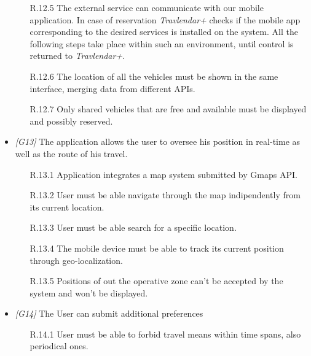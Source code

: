 \begin{itemize}
\begin{itemize}
			\item [R.12.5] The external service can communicate with our mobile application. In case of reservation \textit{Travlendar+} checks if the mobile app corresponding to the desired services is installed on the system. All the following steps take place within such an environment, until control is returned to \textit{Travlendar+}.

			\item [R.12.6] The location of all the vehicles must be shown in the same interface, merging data from different APIs.

			\item[R.12.7] Only shared vehicles that are free and available must be displayed and possibly reserved.

		\end{itemize}





	\item \textit{[G13]} The application allows the user to oversee his position in real-time as well as the route of his travel.

		\begin{itemize}

			\item [R.13.1] Application integrates a map system submitted by Gmaps API.

			\item [R.13.2] User must be able navigate through the map indipendently from its current location.

			\item [R.13.3] User must be able search for a specific location.

			\item [R.13.4] The mobile device must be able to track its current position through geo-localization.

			\item [R.13.5] Positions of out the operative zone can't be accepted by the system and won't be displayed.

		\end{itemize}





	\item \textit{[G14]} The User can submit additional preferences

		\begin{itemize}

			\item[R.14.1] User must be able to forbid travel means within time spans, also periodical ones.


\end{itemize}
\end{itemize}

